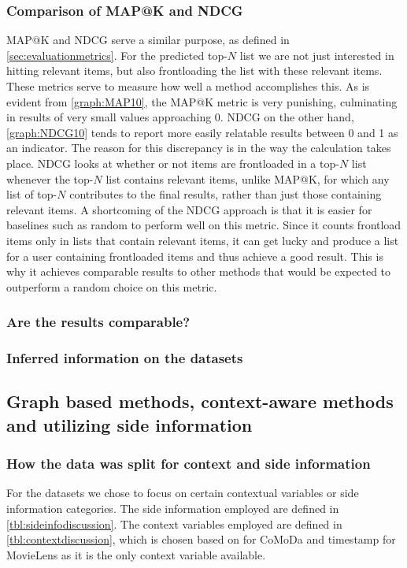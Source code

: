 \subsubsection{Comparison of MAP@K and NDCG}
MAP@K and NDCG serve a similar purpose, as defined in \autoref{sec:evaluationmetrics}.
For the predicted top-$N$ list we are not just interested in hitting relevant items, but also frontloading the list with these relevant items.
These metrics serve to measure how well a method accomplishes this.
As is evident from \autoref{graph:MAP10}, the MAP@K metric is very punishing, culminating in results of very small values approaching 0.
NDCG on the other hand, \autoref{graph:NDCG10} tends to report more easily relatable results between 0 and 1 as an indicator.
The reason for this discrepancy is in the way the calculation takes place.
NDCG looks at whether or not items are frontloaded in a top-$N$ list whenever the top-$N$ list contains relevant items, unlike MAP@K, for which any list of top-$N$ contributes to the final results, rather than just those containing relevant items.
A shortcoming of the NDCG approach is that it is easier for baselines such as random to perform well on this metric.
Since it counts frontload items only in lists that contain relevant items, it can get lucky and produce a list for a user containing frontloaded items and thus achieve a good result.
This is why it achieves comparable results to other methods that would be expected to outperform a random choice on this metric.
\subsubsection{Are the results comparable?}
\subsubsection{Inferred information on the datasets}

\subsection{Graph based methods, context-aware methods and utilizing side information}
\subsubsection{How the data was split for context and side information}
For the datasets we chose to focus on certain contextual variables or side information categories.
The side information employed are defined in \autoref{tbl:sideinfodiscussion}.
The context variables employed are defined in \autoref{tbl:contextdiscussion}, which is chosen based on \cite{COMODA2013} for CoMoDa and timestamp for MovieLens as it is the only context variable available.


